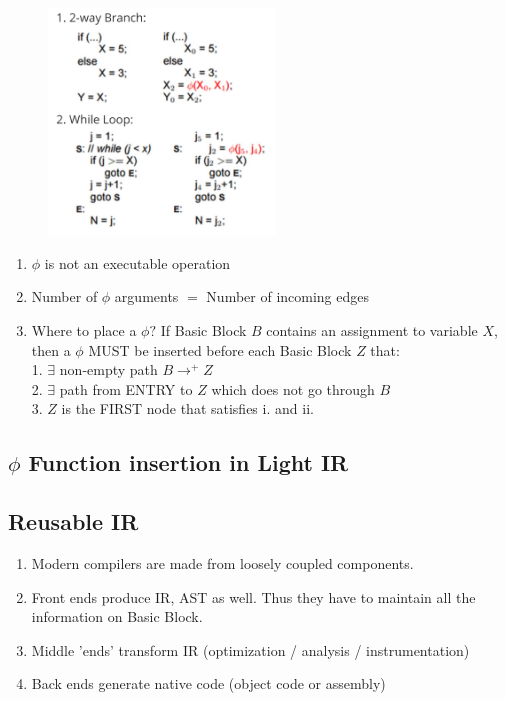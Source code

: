 \documentclass[a4paper]{exam}
\theoremstyle{definition}
\begin{document}
\begin{enumerate}
\begin{enumerate}
                \begin{figure}[htbp]
                  \centering
                  \includegraphics[width=6cm]{img/Snipaste_2021-04-19_17-50-16.png}
                \end{figure}
                \begin{enumerate}
                  \item $\phi$ is not an executable operation
                  \item Number of $\phi$ arguments $=$ Number of incoming edges
                  \item Where to place a $\phi ?$ If Basic Block $B$ contains an assignment to variable $X$, then a $\phi$ MUST be inserted before each Basic Block $Z$ that:\\
                        1. $\exists$ non-empty path $B \rightarrow^{+} Z$\\
                        2. $\exists$ path from ENTRY to $Z$ which does not go through $B$\\
                        3. $Z$ is the FIRST node that satisfies $\mathrm{i}$. and ii.
                \end{enumerate}
        \end{enumerate}
\end{enumerate}
\subsection{$\phi$ Function insertion in Light IR}
\subsection{Reusable IR\cite{llvmintro}}
\begin{enumerate}
  \item Modern compilers are made from loosely coupled components.
  \item Front ends produce IR, AST as well. Thus they have to maintain all the information on Basic Block.
  \item Middle 'ends' transform IR (optimization / analysis / instrumentation)
  \item Back ends generate native code (object code or assembly)
\end{enumerate}
\end{document}
